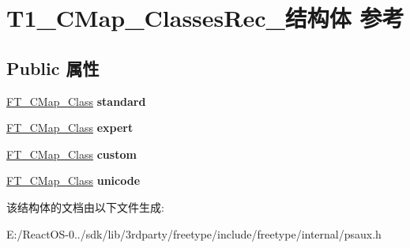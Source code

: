 \hypertarget{struct_t1___c_map___classes_rec__}{}\section{T1\+\_\+\+C\+Map\+\_\+\+Classes\+Rec\+\_\+结构体 参考}
\label{struct_t1___c_map___classes_rec__}
\subsection*{Public 属性}
\begin{DoxyCompactItemize}
\item 
\mbox{\label{struct_t1___c_map___classes_rec___a11bc9e986af1c0cf91bd67e2e30028ca}} 
\hyperlink{struct_f_t___c_map___class_rec__}{F\+T\+\_\+\+C\+Map\+\_\+\+Class} {\bfseries standard}
\item 
\mbox{\label{struct_t1___c_map___classes_rec___a9576c404d5197dd66498725eacde1302}} 
\hyperlink{struct_f_t___c_map___class_rec__}{F\+T\+\_\+\+C\+Map\+\_\+\+Class} {\bfseries expert}
\item 
\mbox{\label{struct_t1___c_map___classes_rec___a21378ef457d58cc00f357011f45fba5e}} 
\hyperlink{struct_f_t___c_map___class_rec__}{F\+T\+\_\+\+C\+Map\+\_\+\+Class} {\bfseries custom}
\item 
\mbox{\label{struct_t1___c_map___classes_rec___aab1eef66893dd7b0d25897612d056d4a}} 
\hyperlink{struct_f_t___c_map___class_rec__}{F\+T\+\_\+\+C\+Map\+\_\+\+Class} {\bfseries unicode}
\end{DoxyCompactItemize}


该结构体的文档由以下文件生成\+:\begin{DoxyCompactItemize}
\item 
E\+:/\+React\+O\+S-\/0../sdk/lib/3rdparty/freetype/include/freetype/internal/psaux.\+h\end{DoxyCompactItemize}
